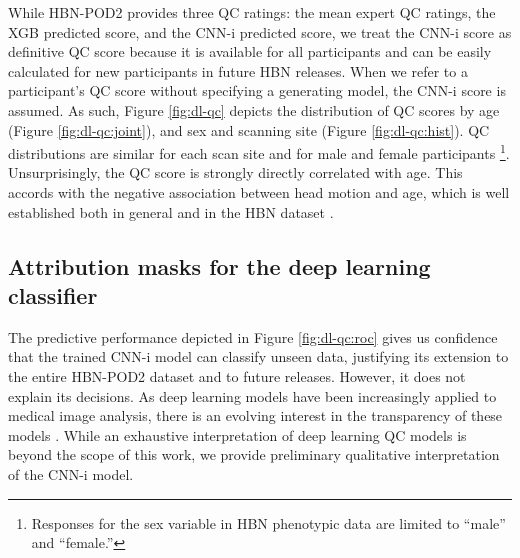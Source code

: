 \documentclass[fleqn,10pt]{wlscirep}
\begin{document}
While HBN-POD2 provides three QC ratings: the mean expert QC ratings, the XGB
predicted score, and the CNN-i predicted score, we treat the CNN-i score as
definitive QC score because it is available for all participants and can be
easily calculated for new participants in future HBN releases. When we refer to
a participant's QC score without specifying a generating model, the CNN-i score
is assumed. As such, Figure \ref{fig:dl-qc} depicts the distribution of QC
scores by age (Figure \ref{fig:dl-qc:joint}), and sex and scanning site (Figure
\ref{fig:dl-qc:hist}). QC distributions are similar for each
scan site and for male and female participants \footnote{%
    Responses for the sex variable in HBN phenotypic data are limited to
    ``male'' and ``female.''
}. Unsurprisingly, the QC score is strongly directly correlated with age. This
accords with the negative association between head motion and age, which is well
established both in general
\cite{power2012spurious,satterthwaite2012impact,fair2012distinct,yendiki2014spurious}
and in the HBN dataset \cite{alexander2017-yc}.

\subsection*{Attribution masks for the deep learning classifier}

The predictive performance depicted in Figure \ref{fig:dl-qc:roc} gives us
confidence that the trained CNN-i model can classify unseen data, justifying its
extension to the entire HBN-POD2 dataset and to future releases. However, it
does not explain its decisions. As deep learning models have been increasingly
applied to medical image analysis, there is an evolving interest in the
transparency of these models \cite{salahuddin2022transparency}. While an
exhaustive interpretation of deep learning QC models is beyond the scope of this
work, we provide preliminary qualitative interpretation of the CNN-i model.
\end{document}
